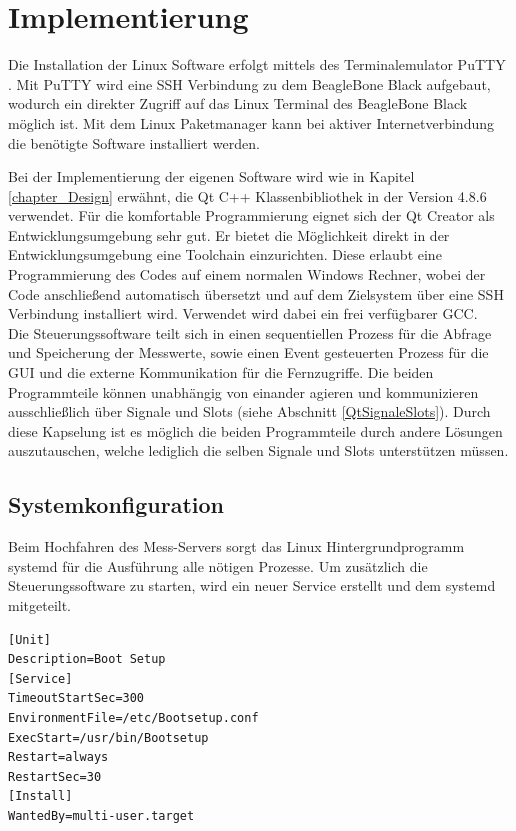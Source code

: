 \chapter{Implementierung}
\label{chapter_Implementierung}



Die Installation der Linux Software erfolgt mittels des Terminalemulator PuTTY \cite{putty}. Mit \mbox{PuTTY} wird eine \ac{SSH} Verbindung zu dem BeagleBone Black aufgebaut, wodurch ein direkter Zugriff auf das Linux Terminal des BeagleBone Black möglich ist. Mit dem Linux Paketmanager kann bei aktiver Internetverbindung die benötigte Software installiert werden.\ 

Bei der Implementierung der eigenen Software wird wie in Kapitel \ref{chapter_Design} erwähnt, die Qt C++ Klassenbibliothek in der Version 4.8.6 verwendet. Für die komfortable Programmierung eignet sich der Qt Creator als Entwicklungsumgebung sehr gut. Er bietet die Möglichkeit direkt in der Entwicklungsumgebung eine Toolchain einzurichten. Diese erlaubt eine Programmierung des Codes auf einem normalen Windows Rechner, wobei der Code anschließend automatisch übersetzt und auf dem Zielsystem über eine \ac{SSH} Verbindung installiert wird. Verwendet wird dabei ein frei verfügbarer \ac{GCC}.\\
Die Steuerungssoftware teilt sich in einen sequentiellen Prozess für die Abfrage und Speicherung der Messwerte, sowie einen Event gesteuerten Prozess für die \ac{GUI} und die externe Kommunikation für die Fernzugriffe. 
Die beiden Programmteile können unabhängig von einander agieren und kommunizieren ausschließlich über Signale und Slots (siehe Abschnitt \ref{QtSignaleSlots}). Durch diese Kapselung ist es möglich die beiden Programmteile durch andere Lösungen auszutauschen, welche lediglich die selben Signale und Slots unterstützen müssen.

\section{Systemkonfiguration}

Beim Hochfahren des Mess-Servers sorgt das Linux Hintergrundprogramm systemd für die Ausführung alle nötigen Prozesse. Um zusätzlich die Steuerungssoftware zu starten, wird ein neuer Service erstellt und dem systemd mitgeteilt.\\
\newpage
\begin{lstlisting}[caption={Systemd Service},label=lst_SystemdService]
[Unit]
Description=Boot Setup
[Service]
TimeoutStartSec=300
EnvironmentFile=/etc/Bootsetup.conf
ExecStart=/usr/bin/Bootsetup
Restart=always
RestartSec=30
[Install]
WantedBy=multi-user.target
\end{lstlisting}

